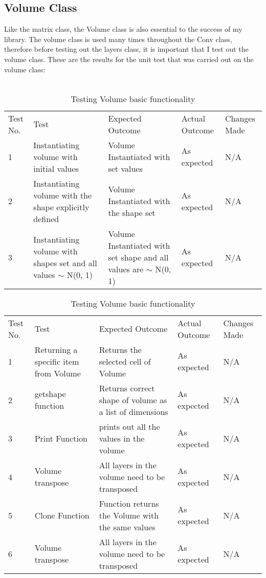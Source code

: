 \subsection{Volume Class}
Like the matrix class, the Volume class is also essential to the success of my library. The volume class is used many times throughout the Conv class, therefore before testing out the layers class, it is important that I test out the volume class. These are the results for the unit test that was carried out on the volume class:
\\ \\
\begin{table}[H]
\centering
    \begin{tabular}{|p{1cm}|p{4cm}|p{4cm}|p{3cm}|p{2cm}|}
        \hline
        Test No. & Test & Expected Outcome & Actual Outcome & Changes Made \\ \cline{1-5} 
        1 & Instantiating volume with initial values & Volume Instantiated with set values & As expected & N/A \\
        \cline{1-5}
        2 & Instantiating volume with the shape explicitly defined & Volume Instantiated with the shape set & As expected & N/A \\
        \cline{1-5}
        3 & Instantiating volume with shapes set and all values $\sim$ N(0, 1) & Volume Instantiated with set shape and all values are $\sim$ N(0, 1) & As expected & N/A \\
        \cline{1-5}
    \end{tabular}
    \caption{Testing Volume Constructors}
    \vspace{0.5cm}

    \begin{tabular}{|p{1cm}|p{4cm}|p{4cm}|p{3cm}|p{2cm}|}
        \hline
        Test No. & Test & Expected Outcome & Actual Outcome & Changes Made \\ \cline{1-5} 
        1 & Returning a specific item from Volume & Returns the selected cell of Volume & As expected & N/A \\
        \cline{1-5}
        2 & getshape function & Returns correct shape of volume as a list of dimensions & As expected & N/A \\ \cline{1-5}
        3 & Print Function & prints out all the values in the volume & As expected & N/A \\ \cline{1-5}
        4 & Volume transpose & All layers in the volume need to be transposed & As expected & N/A \\ \cline{1-5}
        5 & Clone Function & Function returns the Volume with the same values & As expected & N/A \\ \cline{1-5}
        6 & Volume transpose & All layers in the volume need to be transposed & As expected & N/A \\ \cline{1-5}
    \end{tabular}
    \caption{Testing Volume basic functionality}
\end{table}

